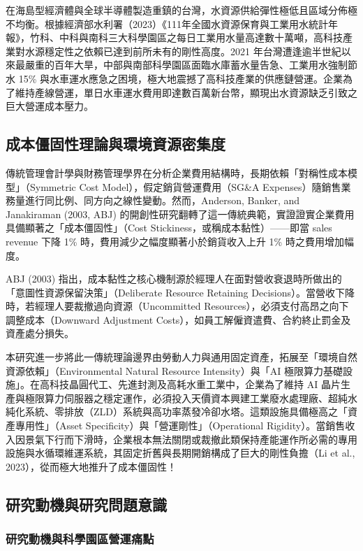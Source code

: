 \documentclass[12pt,a4paper]{article}
\begin{document}
在海島型經濟體與全球半導體製造重鎮的台灣，水資源供給彈性極低且區域分佈極不均衡。根據經濟部水利署（2023）《111年全國水資源保育與工業用水統計年報》，竹科、中科與南科三大科學園區之每日工業用水量高達數十萬噸，高科技產業對水源穩定性之依賴已達到前所未有的剛性高度。2021 年台灣遭逢逾半世紀以來最嚴重的百年大旱，中部與南部科學園區面臨水庫蓄水量告急、工業用水強制節水 15\% 與水車運水應急之困境，極大地震撼了高科技產業的供應鏈營運。企業為了維持產線營運，單日水車運水費用即達數百萬新台幣，顯現出水資源缺乏引致之巨大營運成本壓力。

\subsection{成本僵固性理論與環境資源密集度}

傳統管理會計學與財務管理學界在分析企業費用結構時，長期依賴「對稱性成本模型」（Symmetric Cost Model），假定銷貨營運費用（SG\&A Expenses）隨銷售業務量進行同比例、同方向之線性變動。然而，Anderson, Banker, and Janakiraman (2003, ABJ) 的開創性研究翻轉了這一傳統典範，實證證實企業費用具備顯著之「成本僵固性」（Cost Stickiness，或稱成本黏性）——即當 sales revenue 下降 1\% 時，費用減少之幅度顯著小於銷貨收入上升 1\% 時之費用增加幅度。

ABJ (2003) 指出，成本黏性之核心機制源於經理人在面對營收衰退時所做出的「意圖性資源保留決策」（Deliberate Resource Retaining Decisions）。當營收下降時，若經理人要裁撤過向資源（Uncommitted Resources），必須支付高昂之向下調整成本（Downward Adjustment Costs），如員工解僱資遣費、合約終止罰金及資產處分損失。

本研究進一步將此一傳統理論邊界由勞動人力與通用固定資產，拓展至「環境自然資源依賴」（Environmental Natural Resource Intensity）與「AI 極限算力基礎設施」。在高科技晶圓代工、先進封測及高耗水重工業中，企業為了維持 AI 晶片生產與極限算力伺服器之穩定運作，必須投入天價資本興建工業廢水處理廠、超純水純化系統、零排放（ZLD）系統與高功率蒸發冷卻水塔。這類設施具備極高之「資產專用性」（Asset Specificity）與「營運剛性」（Operational Rigidity）。當銷售收入因景氣下行而下滑時，企業根本無法關閉或裁撤此類保持產能運作所必需的專用設施與水循環維運系統，其固定折舊與長期開銷構成了巨大的剛性負擔（Li et al., 2023），從而極大地推升了成本僵固性！

\subsection{研究動機與研究問題意識}

\subsubsection{研究動機與科學園區營運痛點}
\end{document}
